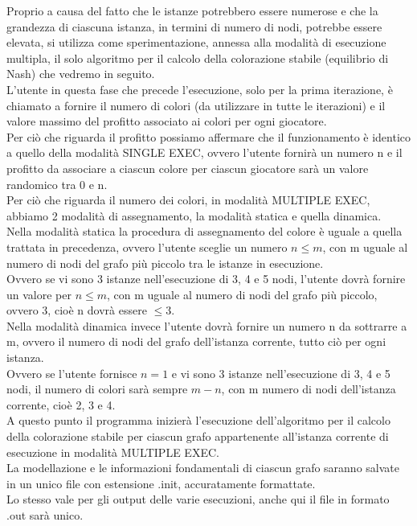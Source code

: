 Proprio a causa del fatto che le istanze potrebbero essere numerose e che la grandezza di ciascuna istanza, in termini di numero di nodi, potrebbe essere elevata, si utilizza come sperimentazione, annessa alla modalità di esecuzione multipla, il solo algoritmo per il calcolo della colorazione stabile (equilibrio di Nash) che vedremo in seguito.\\

L'utente in questa fase che precede l'esecuzione, solo per la prima iterazione, è chiamato a fornire il numero di colori (da utilizzare in tutte le iterazioni) e il valore massimo del profitto associato ai colori per ogni giocatore.\\

Per ciò che riguarda il profitto possiamo affermare che il funzionamento è identico a quello della modalità SINGLE EXEC, ovvero l'utente fornirà un numero n e il profitto da associare a ciascun colore per ciascun giocatore sarà un valore randomico tra 0 e n.\\

Per ciò che riguarda il numero dei colori, in modalità MULTIPLE EXEC, abbiamo 2 modalità di assegnamento, la modalità statica e quella dinamica.\\
Nella modalità statica la procedura di assegnamento del colore è uguale a quella trattata in precedenza, ovvero l'utente sceglie un numero \(n \leq m\), con m uguale al numero di nodi del grafo più piccolo tra le istanze in esecuzione.\\
Ovvero se vi sono 3 istanze nell'esecuzione di 3, 4 e 5 nodi, l'utente dovrà fornire un valore per \(n \leq m\), con m uguale al numero di nodi del grafo più piccolo, ovvero 3, cioè n dovrà essere \(\leq 3\).\\

Nella modalità dinamica invece l'utente dovrà fornire un numero n da sottrarre a m, ovvero il numero di nodi del grafo dell'istanza corrente, tutto ciò per ogni istanza.\\
Ovvero se l'utente fornisce \(n = 1\) e vi sono 3 istanze nell'esecuzione di 3, 4 e 5 nodi, il numero di colori sarà sempre \(m -n\), con m numero di nodi dell'istanza corrente, cioè 2, 3 e 4.\\

A questo punto il programma inizierà l'esecuzione dell'algoritmo per il calcolo della colorazione stabile per ciascun grafo appartenente all'istanza corrente di esecuzione in modalità MULTIPLE EXEC.\\
La modellazione e le informazioni fondamentali di ciascun grafo saranno salvate in un unico file con estensione .init, accuratamente formattate.\\
Lo stesso vale per gli output delle varie esecuzioni, anche qui il file in formato .out sarà unico.\\

